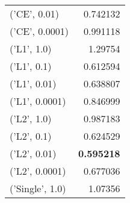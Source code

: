 \begin{tabular}{lr}
 ('CE', 0.01)    &    0.742132 \\
 ('CE', 0.0001)  &    0.991118 \\
 ('L1', 1.0)     &    1.29754  \\
 ('L1', 0.1)     &    0.612594 \\
 ('L1', 0.01)    &    0.638807 \\
 ('L1', 0.0001)  &    0.846999 \\
 ('L2', 1.0)     &    0.987183 \\
 ('L2', 0.1)     &    0.624529 \\
 ('L2', 0.01)    &    {\bf 0.595218} \\
 ('L2', 0.0001)  &    0.677036 \\
 ('Single', 1.0) &    1.07356  \\
\hline
\end{tabular}